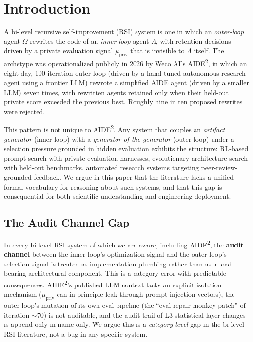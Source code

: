 \documentclass{article}
\theoremstyle{definition}
\begin{document}
\tableofcontents
\bigskip

\setcounter{section}{0}
\section{Introduction}

A bi-level recursive self-improvement (RSI) system is one in which an \emph{outer-loop} agent $\Omega$ rewrites the code of an \emph{inner-loop} agent $\Lambda$, with retention decisions driven by a private evaluation signal $\mu_{\text{priv}}$ that is invisible to $\Lambda$ itself. The archetype was operationalized publicly in 2026 by Weco AI's AIDE\textsuperscript{2}, in which an eight-day, 100-iteration outer loop (driven by a hand-tuned autonomous research agent using a frontier LLM) rewrote a simplified AIDE agent (driven by a smaller LLM) seven times, with rewritten agents retained only when their held-out private score exceeded the previous best. Roughly nine in ten proposed rewrites were rejected.

This pattern is not unique to AIDE\textsuperscript{2}. Any system that couples an \emph{artifact generator} (inner loop) with a \emph{generator-of-the-generator} (outer loop) under a selection pressure grounded in hidden evaluation exhibits the structure: RL-based prompt search with private evaluation harnesses, evolutionary architecture search with held-out benchmarks, automated research systems targeting peer-review-grounded feedback. We argue in this paper that the literature lacks a unified formal vocabulary for reasoning about such systems, and that this gap is consequential for both scientific understanding and engineering deployment.

\subsection{The Audit Channel Gap}

In every bi-level RSI system of which we are aware, including AIDE\textsuperscript{2}, the \textbf{audit channel} between the inner loop's optimization signal and the outer loop's selection signal is treated as implementation plumbing rather than as a load-bearing architectural component. This is a category error with predictable consequences: AIDE\textsuperscript{2}'s published LLM context lacks an explicit isolation mechanism ($\mu_{\text{priv}}$ can in principle leak through prompt-injection vectors), the outer loop's mutation of its own eval pipeline (the ``eval-repair monkey patch'' of iteration $\sim$70) is not auditable, and the audit trail of L3 statistical-layer changes is append-only in name only. We argue this is a \emph{category-level} gap in the bi-level RSI literature, not a bug in any specific system.
\end{document}
